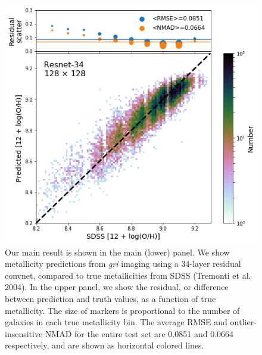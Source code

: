 \documentclass[fleqn,usenatbib]{mnras}
\begin{document}
\begin{figure}
	\includegraphics[width=\columnwidth]{predicted-vs-true-metallicity.png}
	\caption{\label{fig:predicting-metallicity}
		Our main result is shown in the main (lower) panel. 
		We show metallicity predictions from \textit{gri} imaging using a 34-layer residual convnet, compared to true metallicities from SDSS (Tremonti et al. 2004).
		In the upper panel, we show the residual, or difference between prediction and truth values, as a function of true metallicity.
		The size of markers is proportional to the number of galaxies in each true metallicity bin.
		The average RMSE and outlier-insensitive NMAD for the entire test set are 0.0851 and 0.0664 respectively, and are shown as horizontal colored lines.}
\end{figure}
\end{document}
